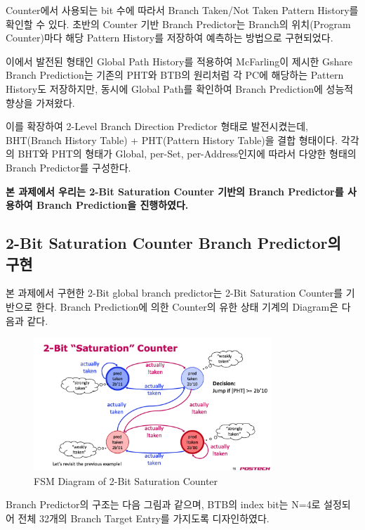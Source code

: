 \documentclass[openright, a4paper]{article}
\begin{document}
Counter에서 사용되는 bit 수에 따라서 Branch Taken/Not Taken Pattern History를 확인할 수 있다. 초반의 Counter 기반 Branch Predictor는 Branch의 위치(Program Counter)마다 해당 Pattern History를 저장하여 예측하는 방법으로 구현되었다.

이에서 발전된 형태인 Global Path History를 적용하여 McFarling이 제시한 Gshare Branch Prediction는 기존의 PHT와 BTB의 원리처럼 각 PC에 해당하는 Pattern History도 저장하지만, 동시에 Global Path를 확인하여 Branch Prediction에 성능적 향상을 가져왔다.

이를 확장하여 2-Level Branch Direction Predictor 형태로 발전시켰는데, BHT(Branch History Table) + PHT(Pattern History Table)을 결합 형태이다. 각각의 BHT와 PHT의 형태가 Global, per-Set, per-Address인지에 따라서 다양한 형태의 Branch Predictor를 구성한다.

\textbf{본 과제에서 우리는 2-Bit Saturation Counter 기반의 Branch Predictor를 사용하여 Branch Prediction을 진행하였다.}

\subsection{2-Bit Saturation Counter Branch Predictor의 구현}

본 과제에서 구현한 2-Bit global branch predictor는 2-Bit Saturation Counter를 기반으로 한다. Branch Prediction에 의한 Counter의 유한 상태 기계의 Diagram은 다음과 같다.

\begin{figure}[h]
    \centering
    \includegraphics[width=0.8\textwidth]{img/2bit_saturation_counter_FSM_diagram.png}
    \caption{FSM Diagram of 2-Bit Saturation Counter}
\end{figure}

Branch Predictor의 구조는 다음 그림과 같으며, BTB의 index bit는 N=4로 설정되어 전체 32개의 Branch Target Entry를 가지도록 디자인하였다.
\end{document}
